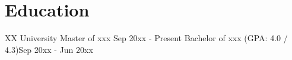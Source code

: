 \section{Education}
    \resumeSubHeadingListStart
    
    \resumeEduSubheading
    {XX University}{}
    {Master of xxx }{Sep 20xx - Present}
    {Bachelor of xxx (GPA: 4.0 / 4.3)}{Sep 20xx - Jun 20xx}
    \resumeItemListStart
    \resumeItemListEnd

    \resumeSubHeadingListEnd